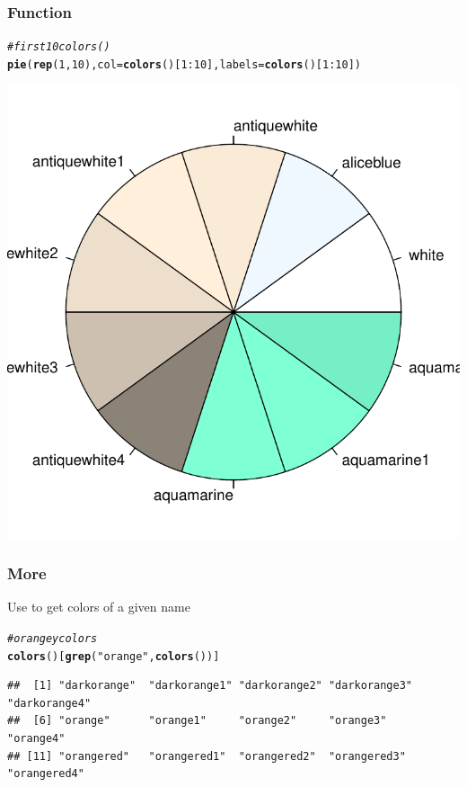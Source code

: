 \documentclass[12pt]{beamer}\usepackage[]{graphicx}\usepackage[]{color}
\makeatletter
\newcommand{\hlnum}[1]{\textcolor[rgb]{0.686,0.059,0.569}{#1}}%
\newcommand{\hlstr}[1]{\textcolor[rgb]{0.192,0.494,0.8}{#1}}%
\newcommand{\hlcom}[1]{\textcolor[rgb]{0.678,0.584,0.686}{\textit{#1}}}%
\newcommand{\hlopt}[1]{\textcolor[rgb]{0,0,0}{#1}}%
\newcommand{\hlstd}[1]{\textcolor[rgb]{0.345,0.345,0.345}{#1}}%
\newcommand{\hlkwc}[1]{\textcolor[rgb]{0.333,0.667,0.333}{#1}}%
\newcommand{\hlkwd}[1]{\textcolor[rgb]{0.737,0.353,0.396}{\textbf{#1}}}%
\newenvironment{kframe}{%
 \def\at@end@of@kframe{}%
 \ifinner\ifhmode%
  \def\at@end@of@kframe{\end{minipage}}%
  \begin{minipage}{\columnwidth}%
 \fi\fi%
 \def\FrameCommand##1{\hskip\@totalleftmargin \hskip-\fboxsep
 \colorbox{shadecolor}{##1}\hskip-\fboxsep
     \hskip-\linewidth \hskip-\@totalleftmargin \hskip\columnwidth}%
 \MakeFramed {\advance\hsize-\width
   \@totalleftmargin\z@ \linewidth\hsize
   \@setminipage}}%
 {\par\unskip\endMakeFramed%
 \at@end@of@kframe}
\newenvironment{knitrout}{}{} %
\makeatother
\begin{document}

\begin{frame}[fragile]
\frametitle{Function }

\begin{knitrout}\scriptsize
{}\color{fgcolor}\begin{kframe}
\begin{alltt}
\hlcom{# first 10 colors()}
\hlkwd{pie}\hlstd{(}\hlkwd{rep}\hlstd{(}\hlnum{1}\hlstd{,} \hlnum{10}\hlstd{),} \hlkwc{col} \hlstd{=} \hlkwd{colors}\hlstd{()[}\hlnum{1}\hlopt{:}\hlnum{10}\hlstd{],} \hlkwc{labels} \hlstd{=} \hlkwd{colors}\hlstd{()[}\hlnum{1}\hlopt{:}\hlnum{10}\hlstd{])}
\end{alltt}
\end{kframe}

{\centering \includegraphics[width=.4\linewidth,height=.4\linewidth]{figure/unnamed-chunk-1-1} 

}



\end{knitrout}

\end{frame}


\begin{frame}[fragile]
\frametitle{More }

Use  to get colors of a given name
\begin{knitrout}\scriptsize
{}\color{fgcolor}\begin{kframe}
\begin{alltt}
\hlcom{# orangey colors}
\hlkwd{colors}\hlstd{()[}\hlkwd{grep}\hlstd{(}\hlstr{"orange"}\hlstd{,} \hlkwd{colors}\hlstd{())]}
\end{alltt}
\begin{verbatim}
##  [1] "darkorange"  "darkorange1" "darkorange2" "darkorange3" "darkorange4"
##  [6] "orange"      "orange1"     "orange2"     "orange3"     "orange4"    
## [11] "orangered"   "orangered1"  "orangered2"  "orangered3"  "orangered4"
\end{verbatim}
\end{kframe}
\end{knitrout}

\end{frame}
\end{document}
